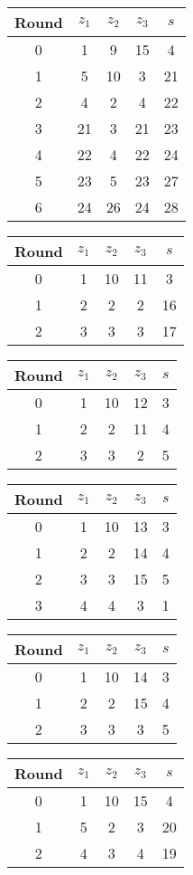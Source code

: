 \begin{multicols}{2}
\begin{tabular}{c | c | c | c | c }
Round & $z_1$ & $z_2$ & $z_3$ & $s$ \\
\hline
0 & 1 & 9 & 15 & 4 \\
1 & 5 & 10 & 3 & 21 \\
2 & 4 & 2 & 4 & 22 \\
3 & 21 & 3 & 21 & 23 \\
4 & 22 & 4 & 22 & 24 \\
5 & 23 & 5 & 23 & 27 \\
6 & 24 & 26 & 24 & 28
\end{tabular}


\begin{tabular}{c | c | c | c | c }
Round & $z_1$ & $z_2$ & $z_3$ & $s$ \\
\hline
0 & 1 & 10 & 11 & 3 \\
1 & 2 & 2 & 2 & 16 \\
2 & 3 & 3 & 3 & 17
\end{tabular}


\begin{tabular}{c | c | c | c | c }
Round & $z_1$ & $z_2$ & $z_3$ & $s$ \\
\hline
0 & 1 & 10 & 12 & 3 \\
1 & 2 & 2 & 11 & 4 \\
2 & 3 & 3 & 2 & 5
\end{tabular}


\begin{tabular}{c | c | c | c | c }
Round & $z_1$ & $z_2$ & $z_3$ & $s$ \\
\hline
0 & 1 & 10 & 13 & 3 \\
1 & 2 & 2 & 14 & 4 \\
2 & 3 & 3 & 15 & 5 \\
3 & 4 & 4 & 3 & 1
\end{tabular}


\begin{tabular}{c | c | c | c | c }
Round & $z_1$ & $z_2$ & $z_3$ & $s$ \\
\hline
0 & 1 & 10 & 14 & 3 \\
1 & 2 & 2 & 15 & 4 \\
2 & 3 & 3 & 3 & 5
\end{tabular}


\begin{tabular}{c | c | c | c | c }
Round & $z_1$ & $z_2$ & $z_3$ & $s$ \\
\hline
0 & 1 & 10 & 15 & 4 \\
1 & 5 & 2 & 3 & 20 \\
2 & 4 & 3 & 4 & 19
\end{tabular}



\end{multicols}
